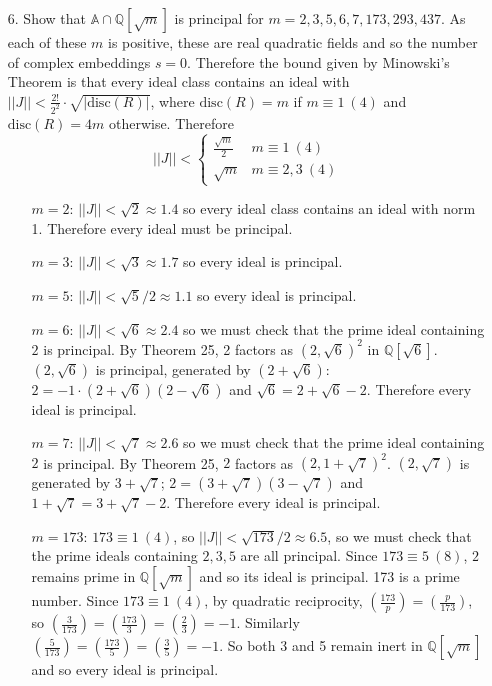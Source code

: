 \documentclass{article}
\newcommand{\Q}[0]{\mathbb{Q}}
\newcommand{\disc}[1]{\text{disc}(#1)}
\newcommand{\modequiv}[3]{#1 \equiv #2\ (#3)}
\newcommand{\ringofintegers}[1]{\mathbb{A} \cap #1}
\newcommand{\legendre}[2]{\genfrac{(}{)}{}{}{#1}{#2}}
\begin{document}
\begin{enumerate}
\item[6.] Show that $\ringofintegers{\Q[\sqrt{m}]}$ is principal for $m = 2, 3, 5, 6, 7, 173, 293, 437$.  As each of these $m$ is positive, these are real quadratic fields and so the number of complex embeddings $s = 0$.  Therefore the bound given by Minowski's Theorem is that every ideal class contains an ideal with $||J|| < \frac{2!}{2^2} \cdot \sqrt{|\disc{R}|}$, where $\disc{R} = m$ if $\modequiv{m}{1}{4}$ and $\disc{R} = 4m$ otherwise.  Therefore \[ ||J|| < \begin{cases}\frac{\sqrt{m}}{2} &\modequiv{m}{1}{4}\\ \sqrt{m} &\modequiv{m}{2, 3}{4}\end{cases} \]

    \begin{itemize}
        \item[$m = 2$: ] $||J|| < \sqrt{2} \approx 1.4$ so every ideal class contains an ideal with norm 1.  Therefore every ideal must be principal.
        \item[$m = 3$: ] $||J|| < \sqrt{3} \approx 1.7$ so every ideal is principal.
        \item[$m = 5$: ] $||J|| < \sqrt{5} / 2 \approx 1.1$ so every ideal is principal.
        \item[$m = 6$: ] $||J|| < \sqrt{6} \approx 2.4$ so we must check that the prime ideal containing $2$ is principal.  By Theorem 25, 2 factors as $(2, \sqrt{6})^2$ in $\Q[\sqrt{6}]$.  $(2, \sqrt{6})$ is principal, generated by $(2 + \sqrt{6})$: $2 = -1 \cdot (2 + \sqrt{6})(2 - \sqrt{6})$ and $\sqrt{6} = 2 + \sqrt{6} - 2$.  Therefore every ideal is principal.
        \item[$m = 7$: ] $||J|| < \sqrt{7} \approx 2.6$ so we must check that the prime ideal containing $2$ is principal.  By Theorem 25, $2$ factors as $(2, 1 + \sqrt{7})^2$.  $(2, \sqrt{7})$ is generated by $3 + \sqrt{7}$; $2 = (3 + \sqrt{7})(3 - \sqrt{7})$ and $1 + \sqrt{7} = 3 + \sqrt{7} - 2$.  Therefore every ideal is principal.
        \item[$m = 173$: ] $\modequiv{173}{1}{4}$, so $||J|| < \sqrt{173} / 2 \approx 6.5$, so we must check that the prime ideals containing $2, 3, 5$ are all principal.  Since $\modequiv{173}{5}{8}$, $2$ remains prime in $\Q[\sqrt{m}]$ and so its ideal is principal.  173 is a prime number.  Since $\modequiv{173}{1}{4}$, by quadratic reciprocity, $\legendre{173}{p} = \legendre{p}{173}$, so $\legendre{3}{173} = \legendre{173}{3} = \legendre{2}{3} = -1$. Similarly $\legendre{5}{173} = \legendre{173}{5} = \legendre{3}{5} = -1$.  So both 3 and 5 remain inert in $\Q[\sqrt{m}]$ and so every ideal is principal.

\end{itemize}
\end{enumerate}
\end{document}
